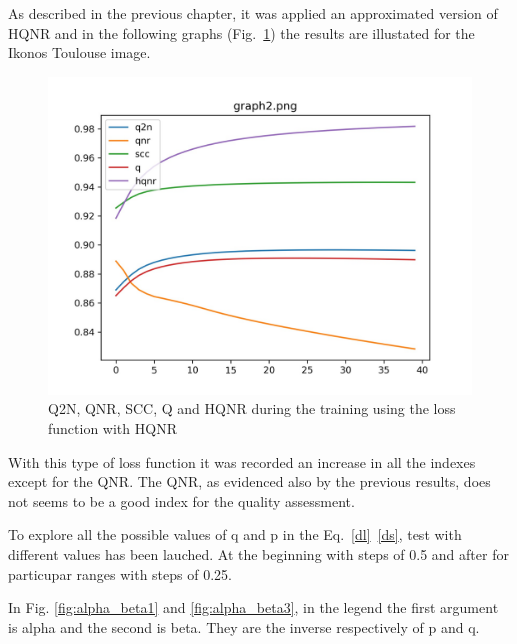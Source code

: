 \documentclass[12pt]{report}
\begin{document}
As described in the previous chapter, it was applied an approximated version of HQNR and in the following graphs (Fig.~\ref{fig:hqnr1})
the results are illustated for the Ikonos Toulouse image.


\begin{figure}[t]
    \centering
    \includegraphics[scale=.2]{toulouse_noref.jpeg}
    \caption{Q2N, QNR, SCC, Q and HQNR during the training using the loss function with HQNR}
    \label{fig:hqnr1}
\end{figure}

With this type of loss function it was recorded an increase in all the indexes except for the QNR.
The QNR, as evidenced also by the previous results, does not seems to be a good index for the quality assessment.

To explore all the possible values of q and p in the Eq.~\ref{dl}~\ref{ds}, 
test with different values has been lauched. At the beginning with steps of 0.5 and after for particupar ranges with steps of 0.25.

In Fig. \ref{fig:alpha_beta1} and \ref{fig:alpha_beta3}, in the legend the first argument is alpha and the second is beta.
They are the inverse respectively of p and q. 
\end{document}
